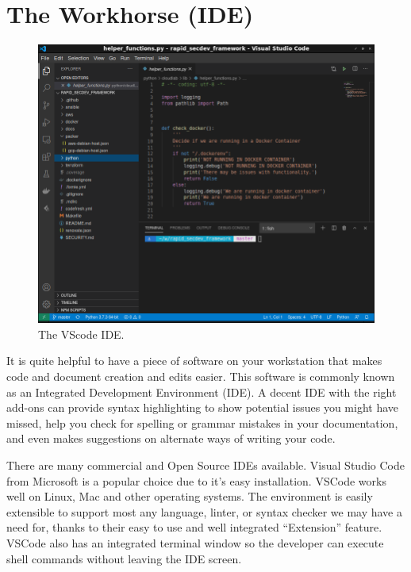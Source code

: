 \section{The Workhorse (IDE)}

\begin{figure}[!htb]
\centering
\includegraphics[scale=0.45]{images/setup-vscode.png}
\caption{The VScode IDE.}
\end{figure}

\justify{}
It is quite helpful to have a piece of software on your workstation that makes code and document creation and edits easier. This
software is commonly known as an Integrated Development Environment (IDE). A decent IDE with the right add-ons can
provide syntax highlighting to show potential issues you might have missed, help you check for spelling or
grammar mistakes in your documentation, and even makes suggestions on alternate ways of writing your code.

\justify{}
There are many commercial and Open Source IDEs available. Visual Studio Code from Microsoft is a popular choice due to it's easy
installation. VSCode works well on Linux, Mac and other operating systems.
The environment is easily extensible to support most any language, linter, or syntax checker we may have a need
for, thanks to their easy to use and well integrated ``Extension'' feature. VSCode also has an integrated terminal
window so the developer can execute shell commands without leaving the IDE screen.

